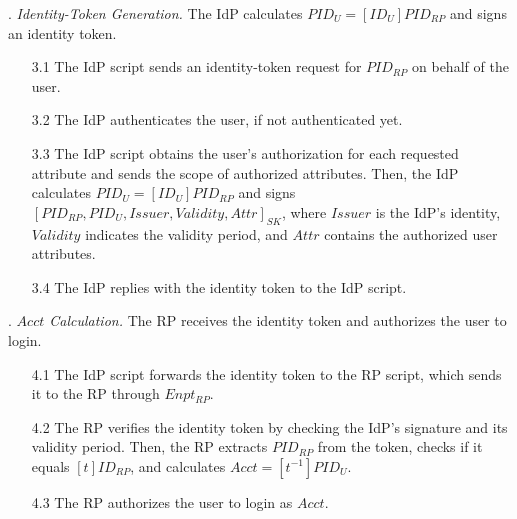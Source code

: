 . {\em Identity-Token Generation.}
The IdP calculates $PID_U = [ID_U]{PID_{RP}}$ and signs an identity token. %
\vspace{-\topsep}
\begin{itemize}
\setlength{\topsep}{0pt}
\setlength{\partopsep}{0pt}
\setlength{\itemsep}{0pt}
\setlength{\parsep}{0pt}
\setlength{\parskip}{0pt}
\item[3.1]
The IdP script sends an identity-token request for $PID_{RP}$ on behalf of the user. %

\item[3.2] The IdP authenticates the user, if not authenticated yet.

\item [3.3]
The IdP script obtains the user's authorization for each requested attribute and sends the scope of authorized attributes. %
\newc
Then, the IdP %
calculates $PID_U = [ID_U]{PID_{RP}}$ %
and signs $[PID_{RP}, PID_U, Issuer, Validity, Attr]_{SK}$,
\oldc
where $Issuer$ is the IdP's identity, $Validity$ indicates the validity period, and $Attr$ contains the authorized user attributes.
\item[3.4] The IdP replies with the identity token to the IdP script.
\end{itemize}

. {\em $Acct$ Calculation.}
The RP receives the identity token and authorizes the user to login.
\vspace{-\topsep}
\begin{itemize}
\setlength{\topsep}{0pt}
\setlength{\partopsep}{0pt}
\setlength{\itemsep}{0pt}
\setlength{\parsep}{0pt}
\setlength{\parskip}{0pt}
\item [4.1]
The IdP script forwards the identity token to the RP script,
    which sends it to the RP through $Enpt_{RP}$.
\item[4.2] The RP verifies the identity token by checking the IdP's signature and its validity period.
Then, \newc
the RP extracts $PID_{RP}$ from the token, checks if it equals $[t]ID_{RP}$,
\oldc
and calculates $Acct = [t^{-1}]{PID_U}$.

\item [4.3] The RP authorizes the user to login as $Acct$.

\end{itemize}


